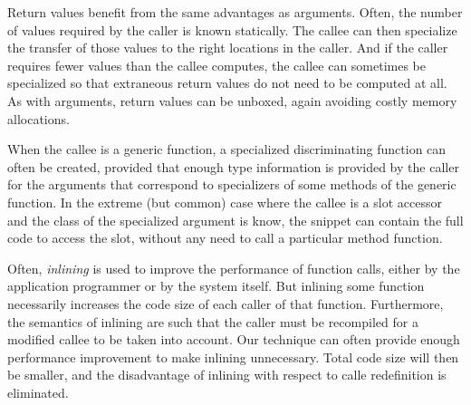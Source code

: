Return values benefit from the same advantages as arguments.  Often,
the number of values required by the caller is known statically.  The
callee can then specialize the transfer of those values to the right
locations in the caller.  And if the caller requires fewer values than
the callee computes, the callee can sometimes be specialized so that
extraneous return values do not need to be computed at all.  As with
arguments, return values can be unboxed, again avoiding costly memory
allocations.

When the callee is a generic function, a specialized discriminating
function can often be created, provided that enough type information
is provided by the caller for the arguments that correspond to
specializers of some methods of the generic function.  In the extreme
(but common) case where the callee is a slot accessor and the class of
the specialized argument is know, the snippet can contain the full
code to access the slot, without any need to call a particular method
function.

Often, \emph{inlining} is used to improve the performance of function
calls, either by the application programmer or by the system itself.
But inlining some function necessarily increases the code size of each
caller of that function.  Furthermore, the semantics of inlining are
such that the caller must be recompiled for a modified callee to be
taken into account.  Our technique can often provide enough
performance improvement to make inlining unnecessary.  Total code size
will then be smaller, and the disadvantage of inlining with respect to
calle redefinition is eliminated.
